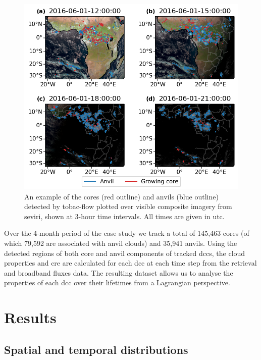 \begin{figure}[tp]
    \includegraphics[width=\textwidth]{figures/ch3_04.png}
    \caption[
    An example of the cores and anvils (detected by tobac-flow, shown at 3-hour time intervals
    ]{
    An example of the cores (red outline) and anvils (blue outline) detected by tobac-flow plotted over visible composite imagery from \acrshort{seviri}, shown at 3-hour time intervals. All times are given in \acrshort{utc}.
    }
    \label{fig:seviri_detection}
\end{figure}


Over the 4-month period of the case study we track a total of 145,463 cores (of which 79,592 are associated with anvil clouds) and 35,941 anvils. 
Using the detected regions of both core and anvil components of tracked \acrshort{dcc}s, the cloud properties and \acrshort{cre} are calculated for each \acrshort{dcc} at each time step from the retrieval and broadband fluxes data. 
The resulting dataset allows us to analyse the properties of each \acrshort{dcc} over their lifetimes from a Lagrangian perspective.

\section{Results}

\subsection{Spatial and temporal distributions}

